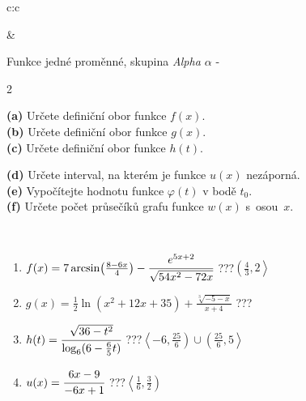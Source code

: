 \documentclass[10pt]{report}
\begin{document}
\begin{tabular}{c:c}
\begin{minipage}[c][104.5mm][t]{0.5\linewidth}
\begin{center}
\end{center}
\end{minipage}
&
\begin{minipage}[c][104.5mm][t]{0.5\linewidth}
\begin{center}
\vspace{7mm}
{\huge Funkce jedné proměnné, skupina \textit{Alpha $\alpha$} -}\\[5mm]
\begin{minipage}{0.95\linewidth}
\begin{center}
{\small \begin{multicols}{2} \raggedright
\textbf{(a)} Určete definiční obor funkce \(f(x)\). \\[1mm]
\textbf{(b)} Určete definiční obor funkce \(g(x)\). \\[1mm]
\textbf{(c)} Určete definiční obor funkce \(h(t)\). \par \columnbreak
\textbf{(d)} Určete interval, na kterém je funkce \(u(x)\) nezáporná. \\[1mm]
\textbf{(e)} Vypočítejte hodnotu funkce \(\varphi(t)\) v bodě \(t_0\). \\[1mm]
\textbf{(f)} Určete počet průsečíků grafu funkce \(w(x)\) s~osou~\(x\). \\[1mm]
\end{multicols}
}
\end{center}
\end{minipage}
\\[4mm]
\begin{minipage}{0.79\linewidth}
\begin{center}
\begin{varwidth}{\linewidth}
\begin{enumerate}
\small
\item $f(x) = 7\arcsin\!\left( \frac{8-6x}{4} \right) - \cfrac{e^{5x+2}}{\sqrt{54x^2-72x}}$\quad \dotfill\; ???\;\dotfill \quad $\left(\frac{4}{3} , 2\right\rangle$
\item $g(x) = \frac{1}{2} \ln{\!(x^2+12x+35)}+\frac{\sqrt[3]{-5-x}}{x+4}$\quad \dotfill\; ???\;\dotfill {}
\item $h(t) = \cfrac{\sqrt{36-t^2}}{\log_6(6-\frac{6}{5}t)}$\quad \dotfill\; ???\;\dotfill \quad $\left\langle-6 , \frac{25}{6}\right)\cup\left(\frac{25}{6} , 5\right\rangle$
\item $u(x) = \cfrac{6x-9}{-6x+1}$\quad \dotfill\; ???\;\dotfill \quad $\left\langle\frac{1}{6} , \frac{3}{2}\right)$

\end{enumerate}
\end{varwidth}
\end{center}
\end{minipage}
\end{center}
\end{minipage}
\end{tabular}
\end{document}
